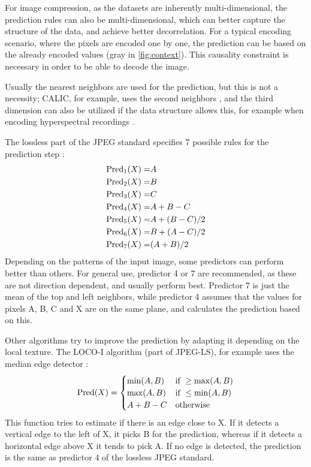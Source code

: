       For image compression, as the datasets are inherently multi-dimensional, the prediction rules can also be multi-dimensional, which can better capture the structure of the data, and achieve better decorrelation. For a typical encoding scenario, where the pixels are encoded one by one, the prediction can be based on the already encoded values (gray in \autoref{fig:context}). This causality constraint is necessary in order to be able to decode the image.

      Usually the nearest neighbors are used for the prediction, but this is not a necessity; CALIC, for example, uses the second neighbors \cite{wu_context-based_1997}, and the third dimension can also be utilized if the data structure allows this, for example when encoding hyperspectral recordings \cite{aranki_hardware_2009}.

      The lossless part of the JPEG standard specifies 7 possible rules for the prediction step \cite{pennebaker_jpeg:_1992}:
      \begin{align*}
        \operatorname{Pred}_1(X) =& A \\
        \operatorname{Pred}_2(X) =& B \\
        \operatorname{Pred}_3(X) =& C \\
        \operatorname{Pred}_4(X) =& A + B - C \\
        \operatorname{Pred}_5(X) =& A + (B - C)/2 \\
        \operatorname{Pred}_6(X) =& B + (A - C)/2 \\
        \operatorname{Pred}_7(X) =& (A + B)/2 \\
      \end{align*}
      Depending on the patterns of the input image, some predictors can perform better than others. For general use, predictor 4 or 7 are recommended, as these are not direction dependent, and usually perform best. Predictor 7 is just the mean of the top and left neighbors, while predictor 4 assumes that the values for pixels A, B, C and X are on the same plane, and calculates the prediction based on this. 

      Other algorithms try to improve the prediction by adapting it depending on the local texture. The LOCO-I algorithm (part of JPEG-LS), for example uses the median edge detector \cite{weinberger_loco-i_2000}:
      \begin{equation}
        \operatorname{Pred}(X) = 
        \begin{cases}
          \min(A,B) & \text{if } \geq \max(A,B) \\
          \max(A,B) & \text{if } \leq \min(A,B) \\
          A + B - C & \text{otherwise }
        \end{cases}
      \end{equation}
      This function tries to estimate if there is an edge close to X. If it detects a vertical edge to the left of X, it picks B for the prediction, whereas if it detects a horizontal edge above X it tends to pick A. If no edge is detected, the prediction is the same as predictor 4 of the lossless JPEG standard.

